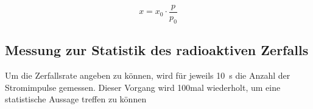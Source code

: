 \begin{equation}
  \label{eq:effektive_laenge}
  x = x_0 \cdot \frac{p}{p_0}
\end{equation}

 
\subsection{Messung zur Statistik des radioaktiven Zerfalls}
Um die Zerfallsrate angeben zu können, wird für jeweils \SI{10}{\second}
die Anzahl der Stromimpulse gemessen. Dieser Vorgang wird 100mal
wiederholt, um eine statistische Aussage treffen zu können
